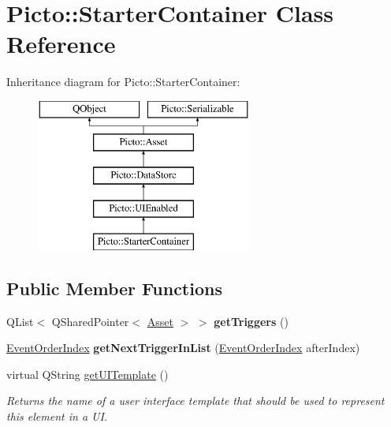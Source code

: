 \hypertarget{class_picto_1_1_starter_container}{\section{Picto\-:\-:Starter\-Container Class Reference}
\label{class_picto_1_1_starter_container}
}
Inheritance diagram for Picto\-:\-:Starter\-Container\-:\begin{figure}[H]
\begin{center}
\leavevmode
\includegraphics[height=5.000000cm]{class_picto_1_1_starter_container}
\end{center}
\end{figure}
\subsection*{Public Member Functions}
\begin{DoxyCompactItemize}
\item 
\hypertarget{class_picto_1_1_starter_container_a8bb19c2e26f8298222a0edba9602b93e}{Q\-List$<$ Q\-Shared\-Pointer$<$ \hyperlink{class_picto_1_1_asset}{Asset} $>$ $>$ {\bfseries get\-Triggers} ()}\label{class_picto_1_1_starter_container_a8bb19c2e26f8298222a0edba9602b93e}

\item 
\hypertarget{class_picto_1_1_starter_container_a04c5ed5bd0bb507108ddb4230939ecf6}{\hyperlink{class_picto_1_1_event_order_index}{Event\-Order\-Index} {\bfseries get\-Next\-Trigger\-In\-List} (\hyperlink{class_picto_1_1_event_order_index}{Event\-Order\-Index} after\-Index)}\label{class_picto_1_1_starter_container_a04c5ed5bd0bb507108ddb4230939ecf6}

\item 
\hypertarget{class_picto_1_1_starter_container_ade09ea95c06829bdd9e835491cfbf47a}{virtual Q\-String \hyperlink{class_picto_1_1_starter_container_ade09ea95c06829bdd9e835491cfbf47a}{get\-U\-I\-Template} ()}\label{class_picto_1_1_starter_container_ade09ea95c06829bdd9e835491cfbf47a}

\begin{DoxyCompactList}\small\item\em Returns the name of a user interface template that should be used to represent this element in a U\-I. \end{DoxyCompactList}\end{DoxyCompactItemize}
